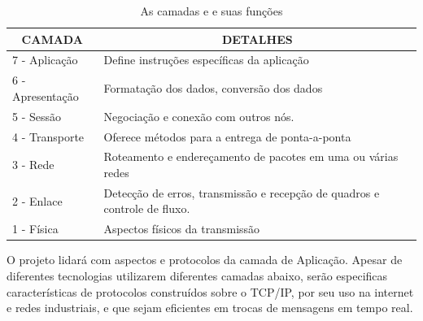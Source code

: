 \begin{table}[h]
\centering
\caption{As camadas e e suas funções}
\begin{tabular}{|l|l|}
\hline
\multicolumn{1}{|c|}{CAMADA} & \multicolumn{1}{c|}{DETALHES}                                                  \\ \hline
7 - Aplicação                & Define instruções específicas da aplicação          						    \\ \hline
6 - Apresentação             & Formatação dos dados, conversão dos dados                     					\\ \hline
5 - Sessão                   & Negociação e conexão com outros nós.                                \\ \hline
4 - Transporte               & Oferece métodos para a entrega de ponta-a-ponta                        			\\ \hline
3 - Rede                     & Roteamento e endereçamento de pacotes em uma ou várias redes                                 \\ \hline
2 - Enlace                   & Detecção de erros, transmissão e recepção de quadros e controle de fluxo.                                                          \\ \hline
1 - Física                   & Aspectos físicos da transmissão \\ \hline
\end{tabular}
\label{table:1.2.0}
\end{table}


O projeto lidará com aspectos e protocolos da camada de Aplicação. Apesar de diferentes tecnologias utilizarem diferentes camadas abaixo, serão especificas características de protocolos construídos sobre o TCP/IP, por seu uso na internet e redes industriais, e que sejam eficientes em trocas de mensagens em tempo real.

